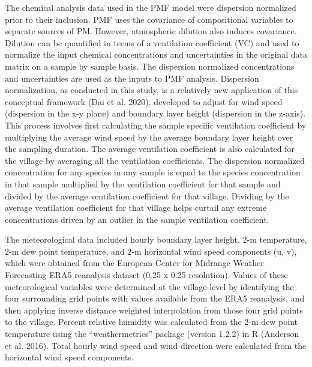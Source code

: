 \documentclass[
  letterpaper,
  DIV=11,
  numbers=noendperiod]{scrartcl}
\begin{document}
The chemical analysis data used in the PMF model were dispersion
normalized prior to their inclusion. PMF uses the covariance of
compositional variables to separate sources of PM. However, atmospheric
dilution also induces covariance. Dilution can be quantified in terms of
a ventilation coefficient (VC) and used to normalize the input chemical
concentrations and uncertainties in the original data matrix on a sample
by sample basis. The dispersion normalized concentrations and
uncertainties are used as the inputs to PMF analysis. Dispersion
normalization, as conducted in this study, is a
relatively new application of this conceptual framework (Dai et al.
2020), developed to adjust for wind speed (dispersion in the x-y plane)
and boundary layer height (dispersion in the z-axis). This process
involves first calculating the sample specific ventilation coefficient
by multiplying the average wind speed by the average boundary layer
height over the sampling duration. The average ventilation coefficient
is also calculated for the village by averaging all the ventilation
coefficients. The dispersion normalized concentration for any species in
any sample is equal to the species concentration in that sample
multiplied by the ventilation coefficient for that sample and divided by
the average ventilation coefficient for that village. Dividing by the
average ventilation coefficient for that village helps curtail any
extreme concentrations driven by an outlier in the sample ventilation
coefficient.

The meteorological data included hourly boundary layer height, 2-m
temperature, 2-m dew point temperature, and 2-m horizontal wind speed
components (u, v), which were obtained from the European Center for
Midrange Weather Forecasting ERA5 reanalysis dataset (0.25 x 0.25
resolution). Values of these meteorological variables were determined at
the village-level by identifying the four surrounding grid points with
values available from the ERA5 reanalysis, and then applying inverse
distance weighted interpolation from those four grid points to the
village. Percent relative humidity was calculated from the 2-m dew point
temperature using the ``weathermetrics'' package (version 1.2.2) in R
(Anderson et al. 2016). Total hourly wind speed and wind direction were
calculated from the horizontal wind speed components.
\end{document}
